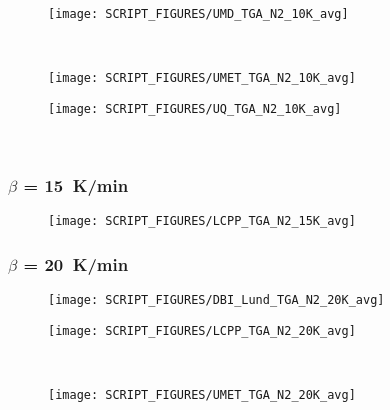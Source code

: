 \begin{minipage}{0.35\textwidth}
\begin{figure}[H]
{\texttt{[image: SCRIPT\_FIGURES/UMD\_TGA\_N2\_10K\_avg]}}\\
\end{figure}
\end{minipage}\\
\begin{minipage}{0.5\textwidth}
\begin{figure}[H]
{\texttt{[image: SCRIPT\_FIGURES/UMET\_TGA\_N2\_10K\_avg]}}\\
\end{figure}
\end{minipage} 
\begin{minipage}{0.35\textwidth}
\begin{figure}[H]
{\texttt{[image: SCRIPT\_FIGURES/UQ\_TGA\_N2\_10K\_avg]}}\\
\end{figure}
\end{minipage}\\

\newpage
\subsubsection{$\beta$ = 15~K/min}
\begin{minipage}{0.5\textwidth}
\begin{figure}[H]
{\texttt{[image: SCRIPT\_FIGURES/LCPP\_TGA\_N2\_15K\_avg]}}\\
\end{figure}
\end{minipage} 


\subsubsection{$\beta$ = 20~K/min}
\begin{minipage}{0.5\textwidth}
\begin{figure}[H]
{\texttt{[image: SCRIPT\_FIGURES/DBI\_Lund\_TGA\_N2\_20K\_avg]}}\\
\end{figure}
\end{minipage} 
\begin{minipage}{0.35\textwidth}
\begin{figure}[H]
{\texttt{[image: SCRIPT\_FIGURES/LCPP\_TGA\_N2\_20K\_avg]}}\\
\end{figure}
\end{minipage}\\
\begin{minipage}{0.5\textwidth}
\begin{figure}[H]
{\texttt{[image: SCRIPT\_FIGURES/UMET\_TGA\_N2\_20K\_avg]}}\\
\end{figure}
\end{minipage} 


